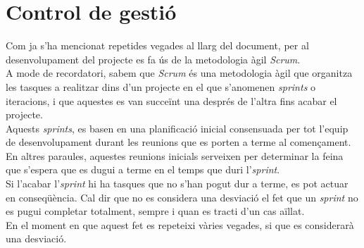 \section{Control de gestió}
Com ja s'ha mencionat repetides vegades al llarg del document, per al desenvolupament del projecte es fa ús de la metodologia àgil \textit{Scrum}.\\
A mode de recordatori, sabem que \textit{Scrum} és una metodologia àgil que organitza les tasques a realitzar dins d'un projecte en el que s'anomenen \textit{sprints} o iteracions, i que aquestes es van succeïnt una després de l'altra fins acabar el projecte.\\
\newline Aquests \textit{sprints}, es basen en una planificació inicial consensuada per tot l'equip de desenvolupament durant les reunions que es porten a terme al començament.\\
En altres paraules, aquestes reunions inicials serveixen per determinar la feina que s'espera que es dugui a terme en el temps que duri l'\textit{sprint}.\\
\newline Si l'acabar l'\textit{sprint} hi ha tasques que no s'han pogut dur a terme, es pot actuar en conseqüència. Cal dir que no es considera una desviació el fet que un \textit{sprint} no es pugui completar totalment, sempre i quan es tracti d'un cas aïllat.\\
En el moment en que aquest fet es repeteixi vàries vegades, si que es considerarà una desviació.\\
